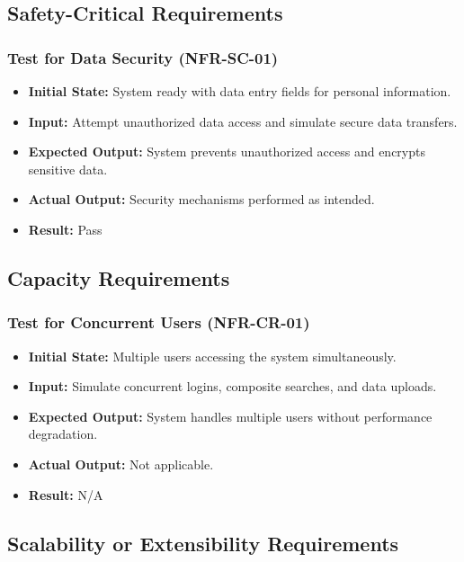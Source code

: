 \documentclass[12pt, titlepage]{article}
\begin{document}
\subsection{Safety-Critical Requirements}

\subsubsection{Test for Data Security (NFR-SC-01)}
\begin{itemize}
    \item \textbf{Initial State: }System ready with data entry fields for personal information.
    \item \textbf{Input: }Attempt unauthorized data access and simulate secure data transfers.
    \item \textbf{Expected Output: }System prevents unauthorized access and encrypts sensitive data.
    \item \textbf{Actual Output: }Security mechanisms performed as intended.
    \item \textbf{Result: }Pass
\end{itemize}

\subsection{Capacity Requirements}

\subsubsection{Test for Concurrent Users (NFR-CR-01)}
\begin{itemize}
    \item \textbf{Initial State: }Multiple users accessing the system simultaneously.
    \item \textbf{Input: }Simulate concurrent logins, composite searches, and data uploads.
    \item \textbf{Expected Output: }System handles multiple users without performance degradation.
    \item \textbf{Actual Output: }Not applicable.
    \item \textbf{Result: }N/A
\end{itemize}

\subsection{Scalability or Extensibility Requirements}
\end{document}
